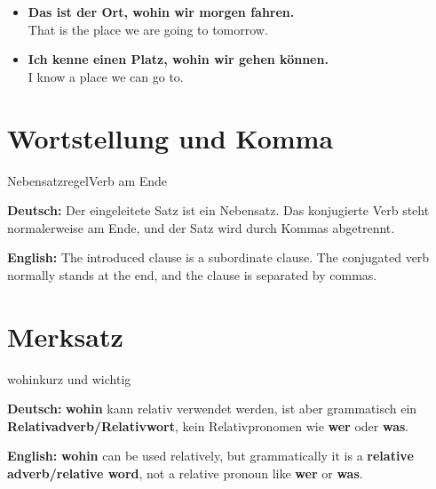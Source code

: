 \documentclass[a4paper,11pt]{article}
\newcommand{\GermanText}[1]{\textbf{Deutsch: }#1\par}
\newcommand{\EnglishText}[1]{{\small\color{SoftGray}\textbf{English: }#1\par}}
\newcommand{\ExampleItem}[2]{\item \textbf{#1}\\{\small\color{SoftGray}#2}}
\begin{document}
\begin{exbox}

\begin{itemize}

\ExampleItem{Das ist der Ort, wohin wir morgen fahren.}{That is the place we are going to tomorrow.}

\ExampleItem{Ich kenne einen Platz, wohin wir gehen können.}{I know a place we can go to.}

\end{itemize}

\end{exbox}

\section{Wortstellung und Komma}

\begin{grammarentry}{Nebensatzregel}{Verb am Ende}

\GermanText{Der eingeleitete Satz ist ein Nebensatz. Das konjugierte Verb steht normalerweise am Ende, und der Satz wird durch Kommas abgetrennt.}

\EnglishText{The introduced clause is a subordinate clause. The conjugated verb normally stands at the end, and the clause is separated by commas.}

\end{grammarentry}

\section{Merksatz}

\begin{grammarentry}{wohin}{kurz und wichtig}

\GermanText{\textbf{wohin} kann relativ verwendet werden, ist aber grammatisch ein \textbf{Relativadverb/Relativwort}, kein Relativpronomen wie \textbf{wer} oder \textbf{was}.}

\EnglishText{\textbf{wohin} can be used relatively, but grammatically it is a \textbf{relative adverb/relative word}, not a relative pronoun like \textbf{wer} or \textbf{was}.}

\end{grammarentry}
\end{document}
